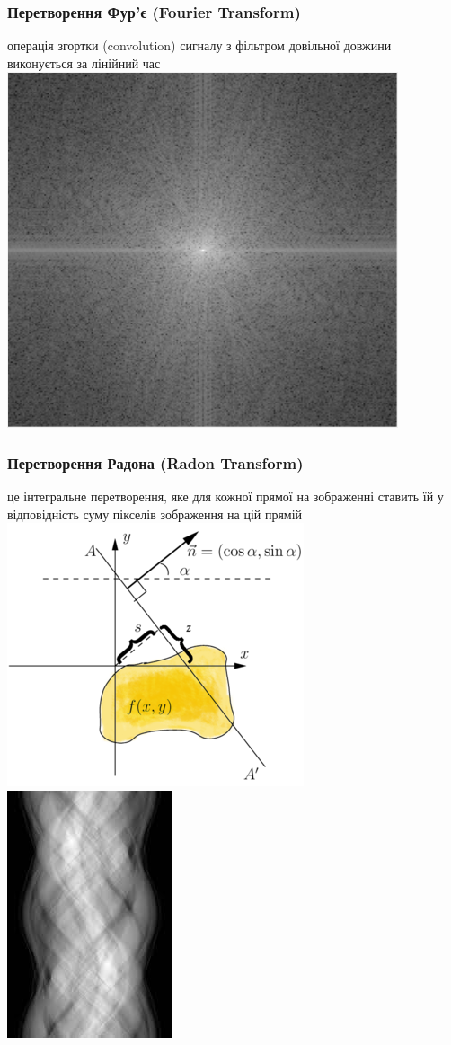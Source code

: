 \documentclass[12pt]{beamer}
\begin{document}
\begin{frame}\frametitle{Перетворення Фур'є (Fourier Transform)  }
		операція згортки (convolution) сигналу з фільтром довільної довжини виконується за лінійний час
		\includegraphics[scale=0.35]{images/fft_2d} 
\end{frame}

\begin{frame}\frametitle{Перетворення Радона (Radon Transform) }
	це інтегральне перетворення, яке для кожної прямої на зображенні ставить їй у відповідність суму пікселів зображення на цій прямій\linebreak
	\includegraphics[scale=0.4]{images/radon} \texttt{}
	\includegraphics[scale=0.4]{images/sinogram} 
\end{frame}
\end{document}

